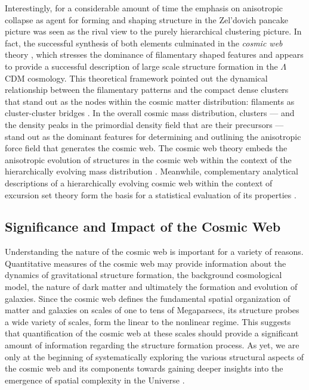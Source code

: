 \documentclass[useAMS,usenatbib]{mnras}
\begin{document}
Interestingly, for a considerable amount of time the emphasis on anisotropic collapse as agent for forming and shaping structure in 
the Zel'dovich pancake picture was seen as the rival view to the purely hierarchical clustering picture. In fact, the successful 
synthesis of both elements culminated in the \emph{cosmic web} theory \citep{bondweb1996}, which stresses the dominance of filamentary 
shaped features and appears to provide a successful description of large scale structure formation in the $\Lambda$CDM cosmology. This theoretical 
framework pointed out the dynamical relationship between the filamentary patterns and the compact dense clusters that stand out 
as the nodes within the cosmic matter distribution: filaments as cluster-cluster bridges \citep[also see][]{bondweb1996,weyedb1996,colberg2005,
weybond2008}. In the overall cosmic mass distribution, clusters --- and the density peaks in the primordial density field that are their 
precursors --- stand out as the dominant features for determining and outlining the anisotropic force field that generates the cosmic web. 
The cosmic web theory embeds the anisotropic evolution of structures in the cosmic web within the context of the hierarchically evolving 
mass distribution \citep{bondmyers1996}. Meanwhile, complementary analytical descriptions of a hierarchically evolving cosmic web within the 
context of excursion set theory form the basis for a statistical evaluation of its properties \citep{shethwey2004,shen2006}.

\subsection{Significance and Impact of the Cosmic Web}
Understanding the nature of the cosmic web is important for a variety of reasons. Quantitative measures of the cosmic web 
may provide information about the dynamics of gravitational structure formation, the background cosmological model, the 
nature of dark matter and ultimately the formation and evolution of galaxies. Since the cosmic web defines the fundamental spatial organization of matter and galaxies on scales of one to tens of Megaparsecs, its structure probes a wide variety of scales, form the linear to the nonlinear regime. This suggests that quantification of the cosmic web at these scales should provide a significant amount of 
information regarding the structure formation process. As yet, we are only at the beginning of systematically exploring the various 
structural aspects of the cosmic web and its components towards gaining deeper insights into the emergence of spatial 
complexity in the Universe \citep[see e.g.][]{cautun2014}. 
\end{document}

